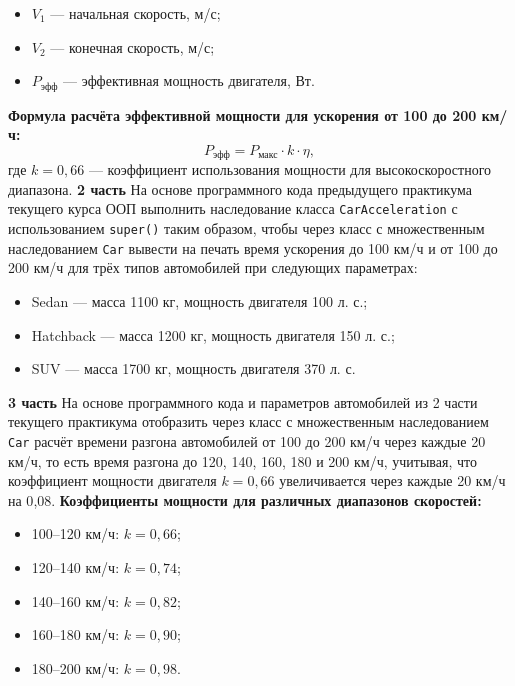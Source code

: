 \begin{enumerate}
\begin{itemize}
        \item $V_1$ — начальная скорость, м/с;  
        \item $V_2$ — конечная скорость, м/с;  
        \item $P_{\text{эфф}}$ — эффективная мощность двигателя, Вт.  
    \end{itemize}
    \textbf{Формула расчёта эффективной мощности для ускорения от 100 до 200 км/ч:}
    \begin{equation}
    P_{\text{эфф}} = P_{\text{макс}} \cdot k \cdot \eta,
    \end{equation}
    где $k = 0{,}66$ — коэффициент использования мощности для высокоскоростного диапазона.  
    \textbf{2 часть}  
    На основе программного кода предыдущего практикума текущего курса ООП выполнить наследование класса \texttt{CarAcceleration} с использованием \texttt{super()} таким образом, чтобы через класс с множественным наследованием \texttt{Car} вывести на печать время ускорения до 100 км/ч и от 100 до 200 км/ч для трёх типов автомобилей при следующих параметрах:  
    \begin{itemize}
        \item Sedan — масса 1100 кг, мощность двигателя 100 л. с.;  
        \item Hatchback — масса 1200 кг, мощность двигателя 150 л. с.;  
        \item SUV — масса 1700 кг, мощность двигателя 370 л. с.  
    \end{itemize}
    \textbf{3 часть}  
    На основе программного кода и параметров автомобилей из 2 части текущего практикума отобразить через класс с множественным наследованием \texttt{Car} расчёт времени разгона автомобилей от 100 до 200 км/ч через каждые 20 км/ч, то есть время разгона до 120, 140, 160, 180 и 200 км/ч, учитывая, что коэффициент мощности двигателя $k = 0{,}66$ увеличивается через каждые 20 км/ч на 0{,}08.  
    \textbf{Коэффициенты мощности для различных диапазонов скоростей:}
    \begin{itemize}
        \item 100–120 км/ч: $k = 0{,}66$;  
        \item 120–140 км/ч: $k = 0{,}74$;  
        \item 140–160 км/ч: $k = 0{,}82$;  
        \item 160–180 км/ч: $k = 0{,}90$;  
        \item 180–200 км/ч: $k = 0{,}98$.  
    \end{itemize}


\end{enumerate}
